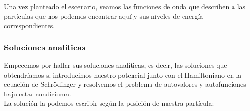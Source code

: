 \documentclass[12pt]{article}
\begin{document}
Una vez planteado el escenario, veamos las funciones de onda que describen a las partículas que nos podemos encontrar aquí y sus niveles de energía correspondientes.

    \subsubsection{Soluciones analíticas}
    Empecemos por hallar sus soluciones analíticas, es decir, las soluciones que obtendríamos si introducimos nuestro potencial junto con el Hamiltoniano en la ecuación de Schrödinger y resolvemos el problema de autovalores y autofunciones bajo estas condiciones.\\

    La solución la podemos escribir según la posición de nuestra partícula:
\end{document}
